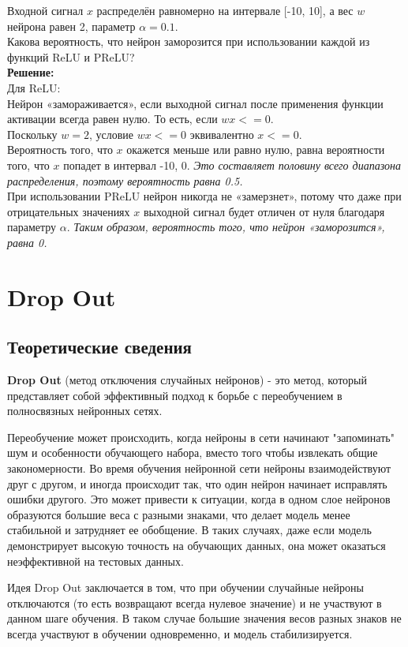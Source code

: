 Входной сигнал $x$ распределён равномерно на интервале [-10, 10], а вес $w$ нейрона равен 2, параметр $\alpha = 0.1$.\\
Какова вероятность, что нейрон заморозится при использовании каждой из функций ReLU и PReLU?\\
\textbf{Решение:}\\
Для ReLU:\\
Нейрон «замораживается», если выходной сигнал после применения функции активации всегда равен нулю. То есть, если $wx <= 0$.\\
Поскольку $w = 2$, условие $wx <= 0$ эквивалентно $x <= 0$.\\
Вероятность того, что $x$ окажется меньше или равно нулю, равна вероятности того, что $x$ попадет в интервал -10, 0. \textit{Это составляет половину всего диапазона распределения, поэтому вероятность равна 0.5.}\\
При использовании PReLU нейрон никогда не «замерзнет», потому что даже при отрицательных значениях $x$ выходной сигнал будет отличен от нуля благодаря параметру $\alpha$.
\textit{Таким образом, вероятность того, что нейрон «заморозится», равна 0.}

\section{Drop Out}
\subsection{Теоретические сведения}

\textbf{Drop Out} (метод отключения случайных нейронов) - это метод, который представляет собой эффективный подход к борьбе с переобучением в полносвязных нейронных сетях.

Переобучение может происходить, когда нейроны в сети начинают "запоминать" шум и особенности обучающего набора, вместо того чтобы извлекать общие закономерности. Во время обучения нейронной сети нейроны взаимодействуют друг с другом, и иногда происходит так, что один нейрон начинает исправлять ошибки другого. Это может привести к ситуации, когда в одном слое нейронов образуются большие веса с разными знаками, что делает модель менее стабильной и затрудняет ее обобщение. В таких случаях, даже если модель демонстрирует высокую точность на обучающих данных, она может оказаться неэффективной на тестовых данных.

Идея Drop Out заключается в том, что при обучении случайные нейроны отключаются (то есть возвращают всегда нулевое значение) и не участвуют в данном шаге обучения. В таком случае большие значения весов разных знаков не всегда участвуют в обучении одновременно, и модель стабилизируется.

